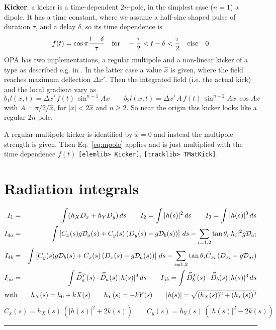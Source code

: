 \documentclass[12pt]{article}
\newcommand\beq{\begin{equation}}
\newcommand\eeq{\end{equation}}
\newcommand{\tilvec}[1]{\vec{\tilde{#1}}}
\newcommand\code[1]{{\tt [#1]}}
\begin{document}
{\bf Kicker}: a kicker is a time-dependent $2n$-pole, in the simplest case ($n=1$) a dipole. It has a time constant, where we assume a half-sine shaped pulse of duration $\tau$, and a delay $\delta$, so its time dependence is
\[
f(t) = \cos \pi \frac{t-\delta}{\tau} \quad\mbox{\rm for}\quad -\frac{\tau}{2}<t-\delta<\frac{\tau}{2}
\quad \mbox{\rm else}\quad 0
\]
OPA has two implementations, a regular multipole and a non-linear kicker of a type as described e.g. in \cite{ATKINSON}. In the latter case a value $\hat{x}$ is given, where the field reaches maximum deflection $\Delta x'$. Then the integrated field (i.e. the actual kick) and the local gradient vary as
\beq
b_1l (x,t) = \Delta x' \,f(t)\,\sin^{n-1} Ax  \qquad
b_2l (x,t) = \Delta x'\, A\, f(t)\, \sin^{n-2}Ax\, \cos Ax
\eeq
with $A=\pi/2/\hat x$, for $|x|<2\hat{x}$ and $n\geq 2$. So near the origin this kicker looks like a regular $2n$-pole.

A regular multipole-kicker is identified by $\hat x=0$ and instead the multipole strength is given. Then Eq.~\ref{eq:mpole} applies and is just multiplied with the time dependence $f(t)$ \code{elemlib> Kicker}, \code{tracklib> TMatKick}.


\section{Radiation integrals}
\begin{table}[t]
\caption{\label{tab:radi}Radiation integrals for a general bending magnet with curvature $h_0$ and focusing strength $k$ including coupling and orbit distortions.}
\begin{eqnarray*}
I_1 & = & \int (h_X D_x +h_Y D_y)\, ds \qquad
I_2 = \int |h(s)|^2\,ds \qquad
I_3 = \int |h(s)|^3\,ds \\
I_{4a} &=& \int
\left[ C_x(s) g {\cal D}_a(s) + C_y(s) \left( D_y(s)-g {\cal D}_b(s)\right) \right]\,ds
-\sum_{i=1,2} \tan\theta_i |h_i|^2 g {\cal D}_{ai} \\
I_{4b} &=& \int
\left[ C_y(s) g {\cal D}_b(s) + C_x(s) \left( D_x(s)-g {\cal D}_a(s)\right) \right]\,ds
-\sum_{i=1,2} \tan\theta_i \bar{C}_{xi}
\left( D_{xi}-g {\cal D}_{ai} \right)  \\
I_{5a} &=& \int \tilvec{D}_a^T (s) \cdot \tilvec{D}_a (s)\,  |h(s)|^3\,ds \qquad
I_{5b} = \int \tilvec{D}_b^T (s) \cdot \tilvec{D}_b (s)\, |h(s)|^3\,ds
\end{eqnarray*}
\[
{\rm with} \qquad h_X(s) = h_0+k X(s) \qquad h_Y(s) = -k Y(s) \qquad |h(s)| = \sqrt{(h_X(s))^2+(h_Y(s))^2}
\]
\[
C_x (s)  =  h_X(s)\,(|h(s)|^2 + 2k(s) ) \qquad
C_y (s)  =  h_Y(s)\,(|h(s)|^2 - 2k(s) ) 
\]
\rule{\hsize}{1pt}
\end{table}
\end{document}
